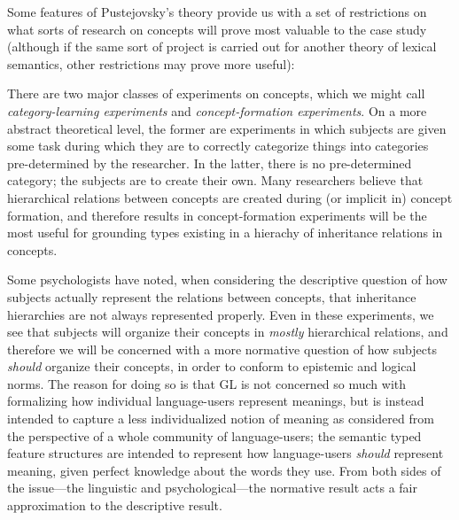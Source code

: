 \documentclass[12pt]{amsart}
\begin{document}
Some features of Pustejovsky's theory provide us with a set of restrictions on what sorts of research on concepts will prove most valuable to the case study (although if the same sort of project is carried out for another theory of lexical semantics, other restrictions may prove more useful):

There are two major classes of experiments on concepts, which we might call \emph{category-learning experiments} and \emph{concept-formation experiments}. On a more abstract theoretical level, the former are experiments in which subjects are given some task during which they are to correctly categorize things into categories pre-determined by the researcher. In the latter, there is no pre-determined category; the subjects are to create their own. Many researchers believe that hierarchical relations between concepts are created during (or implicit in) concept formation, and therefore results in concept-formation experiments will be the most useful for grounding types existing in a hierachy of inheritance relations in concepts.

Some psychologists have noted, when considering the descriptive question of how subjects actually represent the relations between concepts, that inheritance hierarchies are not always represented properly. Even in these experiments, we see that subjects will organize their concepts in \emph{mostly} hierarchical relations, and therefore we will be concerned with a more normative question of how subjects \emph{should} organize their concepts, in order to conform to epistemic and logical norms. The reason for doing so is that GL is not concerned so much with formalizing how individual language-users represent meanings, but is instead intended to capture a less individualized notion of meaning as considered from the perspective of a whole community of language-users; the semantic typed feature structures are intended to represent how language-users \emph{should} represent meaning, given perfect knowledge about the words they use. From both sides of the issue---the linguistic and psychological---the normative result acts a fair approximation to the descriptive result.
\end{document}
